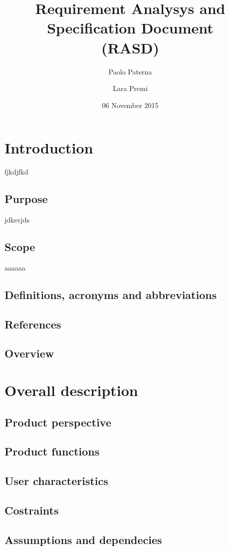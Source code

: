 \documentclass[12pt,a4paper,oneside]{article}
\begin{document}
	\title{Requirement Analysys and Specification Document\\
		(RASD)}
	\author{Paolo Paterna \and Lara Premi}
	\date{06 November 2015}
	\maketitle
	
	\newpage
	
	\section{Introduction}
	fjkdjfkd
	\subsection{Purpose}
	jdksvjds
	\subsection{Scope}
	aaaaaa
	\subsection{Definitions, acronyms and abbreviations}
	\subsection{References}
	\subsection{Overview}
	\section{Overall description}
	\subsection{Product perspective}
	\subsection{Product functions}
	\subsection{User characteristics}
	\subsection{Costraints}
	\subsection{Assumptions and dependecies}
\end{document}
